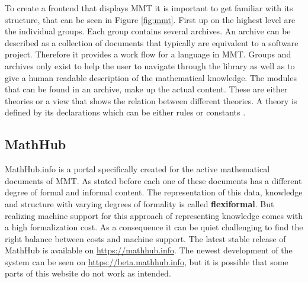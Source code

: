 \documentclass[11pt,a4paper]{article}
\begin{document}
To create a frontend that displays MMT it is important to get familiar with its structure, that can be seen in Figure \ref{fig:mmt}.
First up on the highest level are the individual groups.
Each group contains several archives.
An archive can be described as a collection of documents that typically are equivalent to a software project.
Therefore it provides a work flow for a language in MMT.
Groups and archives only exist to help the user to navigate through the library as well as to give a human readable description of the mathematical knowledge.
The modules that can be found in an archive, make up the actual content.
These are either theories or a view that shows the relation between different theories.
A theory is defined by its declarations which can be either rules or constants \cite{mmt}.

\subsection{MathHub} \label{mathhub}
MathHub.info is a portal specifically created for the active mathematical documents of MMT.
As stated before each one of these documents has a different degree of formal and informal content.
The representation of this data, knowledge and structure with varying degrees of formality is called \textbf{flexiformal}.
But realizing machine support for this approach of representing knowledge comes with a high formalization cost.
As a consequence it can be quiet challenging to find the right balance between costs and machine support.
The latest stable release of MathHub is available on \url{https://mathhub.info}.
The newest development of the system can be seen on \url{https://beta.mathhub.info}, but it is possible that some parts of this website do not work as intended. 
\end{document}
